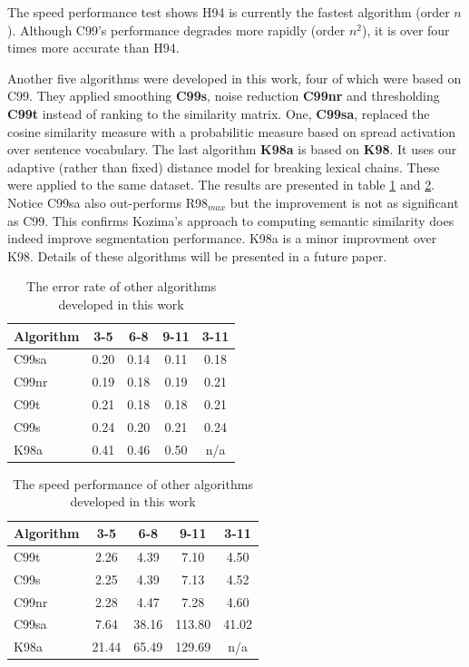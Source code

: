 \documentclass[11pt]{article}
\begin{document}
The speed performance test shows H94 is currently the fastest algorithm (order $n$). Although C99's performance degrades more rapidly (order $n^2$), it is over four times more accurate than H94.

Another five algorithms were developed in this work, four of which were based on C99. They applied smoothing {\bf C99s}, noise reduction {\bf C99nr} and thresholding {\bf C99t} instead of ranking to the similarity matrix. One, {\bf C99sa}, replaced the cosine similarity measure with a probabilitic measure based on spread activation over sentence vocabulary. The last algorithm {\bf K98a} is based on {\bf K98}. It uses our adaptive (rather than fixed) distance model for breaking lexical chains. These were applied to the same dataset. The results are presented in table \ref{tbl:accuracy2} and \ref{tbl:speed2}. Notice C99sa also out-performs R98$_{max}$ but the improvement is not as significant as C99. This confirms Kozima's approach \cite{kozima_1993} to computing semantic similarity does indeed improve segmentation performance. K98a is a minor improvment over K98. Details of these algorithms will be presented in a future paper. 

\begin{table}[ht]
\begin{center}
\begin{tabular}{|l|c|c|c|c|}
\hline
Algorithm & 3-5 & 6-8 & 9-11 & 3-11\\
\hline
C99sa & 0.20 & 0.14 & 0.11 & 0.18\\
C99nr & 0.19 & 0.18 & 0.19 & 0.21\\
C99t & 0.21 & 0.18 & 0.18 & 0.21\\
C99s & 0.24 & 0.20 & 0.21 & 0.24\\
K98a & 0.41 & 0.46 & 0.50 & n/a\\
\hline
\end{tabular}
\end{center}
\caption{The error rate of other algorithms developed in this work}
\label{tbl:accuracy2}
\end{table}

\begin{table}[ht]
\begin{center}
\begin{tabular}{|l|c|c|c|c|}
\hline
Algorithm & 3-5 & 6-8 & 9-11 & 3-11\\
\hline
C99t & 2.26 & 4.39 & 7.10 & 4.50\\
C99s & 2.25 & 4.39 & 7.13 & 4.52\\
C99nr & 2.28 & 4.47 & 7.28 & 4.60\\
C99sa & 7.64 & 38.16 & 113.80 & 41.02\\
K98a & 21.44 & 65.49 & 129.69 & n/a\\
\hline
\end{tabular}
\end{center}
\caption{The speed performance of other algorithms developed in this work}
\label{tbl:speed2}	
\end{table}
\end{document}
